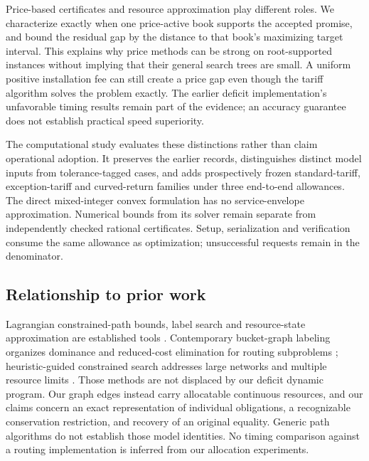 Price-based certificates and resource approximation play different roles. We characterize exactly when one price-active book supports the accepted promise, and bound the residual gap by the distance to that book's maximizing target interval. This explains why price methods can be strong on root-supported instances without implying that their general search trees are small. A uniform positive installation fee can still create a price gap even though the tariff algorithm solves the problem exactly. The earlier deficit implementation's unfavorable timing results remain part of the evidence; an accuracy guarantee does not establish practical speed superiority.

The computational study evaluates these distinctions rather than claim operational adoption. It preserves the earlier records, distinguishes distinct model inputs from tolerance-tagged cases, and adds prospectively frozen standard-tariff, exception-tariff and curved-return families under three end-to-end allowances. The direct mixed-integer convex formulation has no service-envelope approximation. Numerical bounds from its solver remain separate from independently checked rational certificates. Setup, serialization and verification consume the same allowance as optimization; unsuccessful requests remain in the denominator.

\subsection{Relationship to prior work}
Lagrangian constrained-path bounds, label search and resource-state approximation are established tools \citep{HandlerZang1980,BeasleyChristofides1989,Fisher1981,Hassin1992,LorenzRaz2001,PuglieseGuerriero2013}. Contemporary bucket-graph labeling organizes dominance and reduced-cost elimination for routing subproblems \citep{Sadykov2021}; heuristic-guided constrained search addresses large networks and multiple resource limits \citep{Ahmadi2025}. Those methods are not displaced by our deficit dynamic program. Our graph edges instead carry allocatable continuous resources, and our claims concern an exact representation of individual obligations, a recognizable conservation restriction, and recovery of an original equality. Generic path algorithms do not establish those model identities. No timing comparison against a routing implementation is inferred from our allocation experiments.

